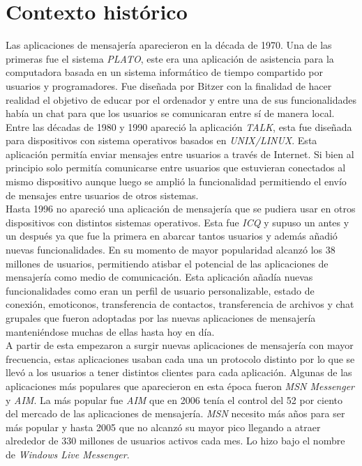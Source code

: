 \section{Contexto histórico}
Las aplicaciones de mensajería aparecieron en la década de 1970. Una de las primeras fue el sistema \emph{PLATO}, este era una aplicación de asistencia para la computadora basada en un sistema informático de tiempo compartido por usuarios y programadores. Fue diseñada por Bitzer con la finalidad de hacer realidad el objetivo de educar por el ordenador y entre una de sus funcionalidades había un chat para que los usuarios se comunicaran entre sí de manera local.\\ 
Entre las décadas de 1980 y 1990 apareció la aplicación \emph{TALK}, esta fue diseñada para dispositivos con sistema operativos basados en \emph{UNIX/LINUX}. Esta aplicación permitía enviar mensajes entre usuarios a través de Internet. Si bien al principio solo permitía comunicarse entre usuarios que estuvieran conectados al mismo dispositivo aunque luego se amplió la funcionalidad permitiendo el envío de mensajes entre usuarios de otros sistemas.\\
Hasta 1996 no apareció una aplicación de mensajería que se pudiera usar en otros dispositivos con distintos sistemas operativos. 
Esta fue \emph{ICQ} y supuso un antes y un después ya que fue la primera en abarcar tantos usuarios y además añadió nuevas funcionalidades. En su momento de mayor popularidad alcanzó los 38 millones de usuarios, permitiendo atisbar el potencial de las aplicaciones de mensajería como medio de comunicación.
Esta aplicación añadía nuevas funcionalidades como eran un perfil de usuario personalizable, estado de conexión, emoticonos, transferencia de contactos, transferencia de archivos y chat grupales que fueron adoptadas por las nuevas aplicaciones de mensajería manteniéndose muchas de ellas hasta hoy en día.\\
A partir de esta empezaron a surgir nuevas aplicaciones de mensajería con mayor frecuencia, estas aplicaciones usaban cada una un protocolo distinto por lo que se llevó a los usuarios a tener distintos clientes para cada aplicación.
Algunas de las aplicaciones más populares que aparecieron en esta época fueron \emph{MSN Messenger} y \emph{AIM}. La más popular fue \emph{AIM} que en 2006 tenía el control del 52 por ciento del mercado de las aplicaciones de mensajería. \emph{MSN} necesito más años para ser más popular y hasta 2005 que no alcanzó su mayor pico llegando a atraer alrededor de 330 millones de usuarios activos cada mes. Lo hizo bajo el nombre de \emph{Windows Live Messenger}.\\ 
